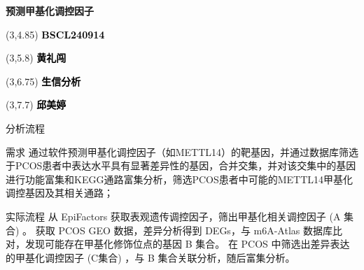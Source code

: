 \documentclass[
  ignorenonframetext,
]{beamer}
\author{}
\date{\vspace{-2.5em}}
\begin{document}
\begin{frame}
\begin{titlepage} 
\begin{center} \textbf{\huge 预测甲基化调控因子}
\vspace{4em} \begin{textblock}{10}(3,4.85) \Large
\textbf{\textcolor{black}{BSCL240914}}
\end{textblock} \begin{textblock}{10}(3,5.8)
\Large \textbf{\textcolor{black}{黄礼闯}}
\end{textblock} \begin{textblock}{10}(3,6.75)
\Large
\textbf{\textcolor{black}{生信分析}}
\end{textblock} \begin{textblock}{10}(3,7.7)
\Large
\textbf{\textcolor{black}{邱美婷}}
\end{textblock} \end{center} \end{titlepage}
\restoregeometry


\begin{center}\vspace{1.5cm}\end{center}\tableofcontents

\begin{center}\vspace{1.5cm}\end{center}\listoffigures

\begin{center}\vspace{1.5cm}\end{center}\listoftables



\end{frame}

\begin{frame}{分析流程}
\protect\hypertarget{abstract}{}
\begin{block}{需求}
\protect\hypertarget{ux9700ux6c42}{}
通过软件预测甲基化调控因子（如METTL14）的靶基因，并通过数据库筛选于PCOS患者中表达水平具有显著差异性的基因，合并交集，并对该交集中的基因进行功能富集和KEGG通路富集分析，筛选PCOS患者中可能的METTL14甲基化调控基因及其相关通路；
\end{block}

\begin{block}{实际流程}
\protect\hypertarget{ux5b9eux9645ux6d41ux7a0b}{}
从 EpiFactors 获取表观遗传调控因子，筛出甲基化相关调控因子 (A 集合) 。
获取 PCOS GEO 数据，差异分析得到 DEGs，与 m6A-Atlas
数据库比对，发现可能存在甲基化修饰位点的基因 B 集合。 在 PCOS
中筛选出差异表达的甲基化调控因子 (C集合) ，与 B
集合关联分析，随后富集分析。
\end{block}
\end{frame}
\end{document}

